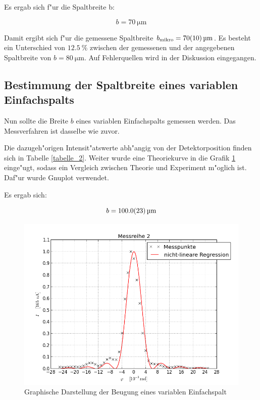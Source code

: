 			Es ergab sich f"ur die Spaltbreite b:

			\begin{equation}
				b = \SI{70}{\micro \meter}
			\end{equation}

			Damit ergibt sich f"ur die gemessene Spaltbreite $b_\mathrm{mikro} = \SI{70 (10)}{\micro \meter}$.
			Es besteht ein Unterschied von $\SI{12.5}{\percent}$ zwischen der gemessenen und der angegebenen Spaltbreite von $b = \SI{80}{\micro \meter}$.
			Auf Fehlerquellen wird in der Diskussion eingegangen.
			\clearpage
			\newpage

	\subsection{Bestimmung der Spaltbreite eines variablen Einfachspalts} 
		\label{sub:bestimmung_der_spaltbreite_eines_variablen_einfachspalts}
		
		Nun sollte die Breite $b$ eines variablen Einfachspalts gemessen werden. Das Messverfahren ist dasselbe wie zuvor.

		Die dazugeh"origen Intensit"atswerte abh"angig von der Detektorposition finden sich in Tabelle \ref{tabelle_2}. Weiter wurde eine Theoriekurve in die Grafik \ref{graph2} einge"ugt, sodass ein Vergleich zwischen Theorie und Experiment m"oglich ist. Daf"ur wurde Gnuplot verwendet.

		Es ergab sich:

		\begin{equation}
			b = \SI{100.0 (23)}{\micro \meter}
		\end{equation}

		

		\begin{figure}[H]
			\centering
			\includegraphics[width = 16cm]{graph_2.png}
			\caption{Graphische Darstellung der Beugung eines variablen Einfachspalt}
			\label{graph2}
		\end{figure}

